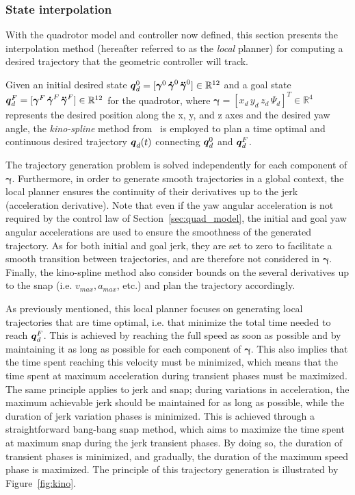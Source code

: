 \subsubsection{State interpolation}\label{sec:kinosplines}

With the quadrotor model and controller now defined, this section presents the interpolation method (hereafter referred to as the \emph{local} planner) for computing a desired trajectory that the geometric controller will track.

Given an initial desired state $\boldsymbol{q}_d^0 = [\boldsymbol{\gamma}^0 \, \boldsymbol{\Dot{\gamma}}^0 \, \boldsymbol{\Ddot{\gamma}}^0] \in \mathbb{R}^{12}$ and a goal state $\boldsymbol{q}_d^F = [\boldsymbol{\gamma}^F \, \boldsymbol{\Dot{\gamma}}^F \, \boldsymbol{\Ddot{\gamma}}^F] \in \mathbb{R}^{12}$ for the quadrotor, where $\boldsymbol{\gamma} = [x_{d} \, y_{d} \, z_{d} \, \Psi_{d}]^T \in \mathbb{R}^{4}$ represents the desired position along the x, y, and z axes and the desired yaw angle, the \emph{kino-spline} method from~\cite{cKino} is employed to plan a time optimal and continuous desired trajectory $\boldsymbol{q}_d(t)$ connecting $\boldsymbol{q}_d^0$ and $\boldsymbol{q}_d^F$. 

The trajectory generation problem is solved independently for each component of $\boldsymbol{\gamma}$.
Furthermore, in order to generate smooth trajectories in a global context, the local planner ensures the continuity of their derivatives up to the jerk (acceleration derivative). 
Note that even if the yaw angular acceleration is not required by the control law of Section~\ref{sec:quad_model}, the initial and goal yaw angular accelerations are used to ensure the smoothness of the generated trajectory. 
As for both initial and goal jerk, they are set to zero to facilitate a smooth transition between trajectories, and are therefore not considered in $\boldsymbol{\gamma}$.
Finally, the kino-spline method also consider bounds on the several derivatives up to the snap (i.e. $v_{max}, a_{max}$, etc.) and plan the trajectory accordingly.

As previously mentioned, this local planner focuses on generating local trajectories that are time optimal, i.e. that minimize the total time needed to reach $\boldsymbol{q}_d^F$.
This is achieved by reaching the full speed as soon as possible and by maintaining it as long as possible for each component of $\boldsymbol{\gamma}$.
This also implies that the time spent reaching this velocity must be minimized, which means that the time spent at maximum acceleration during transient phases must be maximized.
The same principle applies to jerk and snap; during variations in acceleration, the maximum achievable jerk should be maintained for as long as possible, while the duration of jerk variation phases is minimized.
This is achieved through a straightforward bang-bang snap method, which aims to maximize the time spent at maximum snap during the jerk transient phases.
By doing so, the duration of transient phases is minimized, and gradually, the duration of the maximum speed phase is maximized.
The principle of this trajectory generation is illustrated by Figure~\ref{fig:kino}.

